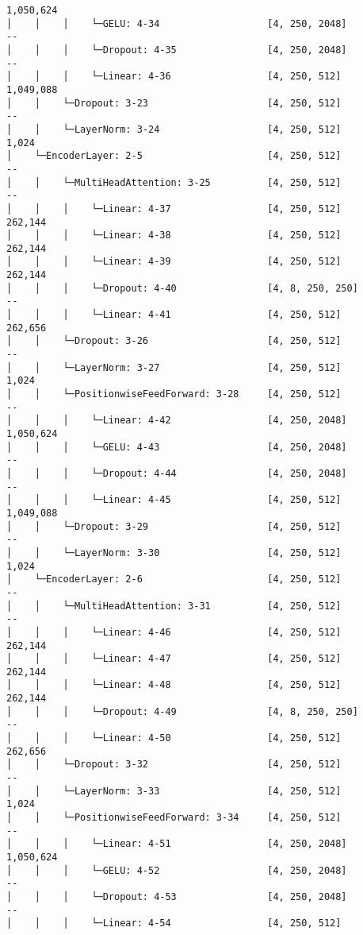 \documentclass[12pt]{article}
\begin{document}
\begin{Verbatim}[commandchars=\\\{\}]
1,050,624
│    │    │    └─GELU: 4-34                   [4, 250, 2048]            --
│    │    │    └─Dropout: 4-35                [4, 250, 2048]            --
│    │    │    └─Linear: 4-36                 [4, 250, 512]
1,049,088
│    │    └─Dropout: 3-23                     [4, 250, 512]             --
│    │    └─LayerNorm: 3-24                   [4, 250, 512]             1,024
│    └─EncoderLayer: 2-5                      [4, 250, 512]             --
│    │    └─MultiHeadAttention: 3-25          [4, 250, 512]             --
│    │    │    └─Linear: 4-37                 [4, 250, 512]             262,144
│    │    │    └─Linear: 4-38                 [4, 250, 512]             262,144
│    │    │    └─Linear: 4-39                 [4, 250, 512]             262,144
│    │    │    └─Dropout: 4-40                [4, 8, 250, 250]          --
│    │    │    └─Linear: 4-41                 [4, 250, 512]             262,656
│    │    └─Dropout: 3-26                     [4, 250, 512]             --
│    │    └─LayerNorm: 3-27                   [4, 250, 512]             1,024
│    │    └─PositionwiseFeedForward: 3-28     [4, 250, 512]             --
│    │    │    └─Linear: 4-42                 [4, 250, 2048]
1,050,624
│    │    │    └─GELU: 4-43                   [4, 250, 2048]            --
│    │    │    └─Dropout: 4-44                [4, 250, 2048]            --
│    │    │    └─Linear: 4-45                 [4, 250, 512]
1,049,088
│    │    └─Dropout: 3-29                     [4, 250, 512]             --
│    │    └─LayerNorm: 3-30                   [4, 250, 512]             1,024
│    └─EncoderLayer: 2-6                      [4, 250, 512]             --
│    │    └─MultiHeadAttention: 3-31          [4, 250, 512]             --
│    │    │    └─Linear: 4-46                 [4, 250, 512]             262,144
│    │    │    └─Linear: 4-47                 [4, 250, 512]             262,144
│    │    │    └─Linear: 4-48                 [4, 250, 512]             262,144
│    │    │    └─Dropout: 4-49                [4, 8, 250, 250]          --
│    │    │    └─Linear: 4-50                 [4, 250, 512]             262,656
│    │    └─Dropout: 3-32                     [4, 250, 512]             --
│    │    └─LayerNorm: 3-33                   [4, 250, 512]             1,024
│    │    └─PositionwiseFeedForward: 3-34     [4, 250, 512]             --
│    │    │    └─Linear: 4-51                 [4, 250, 2048]
1,050,624
│    │    │    └─GELU: 4-52                   [4, 250, 2048]            --
│    │    │    └─Dropout: 4-53                [4, 250, 2048]            --
│    │    │    └─Linear: 4-54                 [4, 250, 512]

\end{Verbatim}
\end{document}
